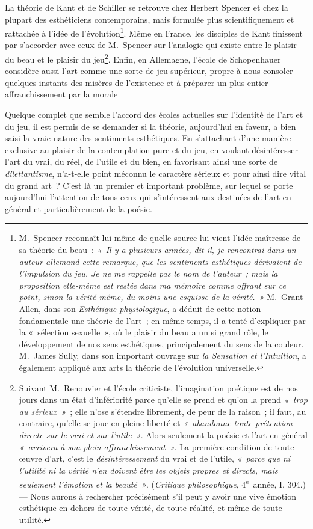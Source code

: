 \documentclass[french,twoside]{book} %
\begin{document}
La théorie de Kant et de Schiller se retrouve chez Herbert Spencer et chez la plupart des esthéticiens contemporains, mais formulée plus scientifiquement et rattachée à l’idée de l’évolution\footnote{M. Spencer reconnaît lui-même de quelle source lui vient l’idée maîtresse de sa théorie du beau : \emph{« Il y a plusieurs années, dit-il, je rencontrai dans un auteur allemand cette remarque, que les sentiments esthétiques dérivaient de l’impulsion du jeu. Je ne me rappelle pas le nom de l’auteur ; mais la proposition elle-même est restée dans ma mémoire comme offrant sur ce point, sinon la vérité même, du moins une esquisse de la vérité. »} M. Grant Allen, dans son \emph{Esthétique physiologique}, a déduit de cette notion fondamentale une théorie de l’art ; en même temps, il a tenté d’expliquer par la « sélection sexuelle », où le plaisir du beau a un si grand rôle, le développement de nos sens esthétiques, principalement du sens de la couleur. M. James Sully, dans son important ouvrage sur \emph{la Sensation et l’Intuition}, a également appliqué aux arts la théorie de l’évolution universelle.}. Même en France, les  disciples de Kant finissent par s’accorder avec ceux de M. Spencer sur l’analogie qui existe entre le plaisir du beau et le plaisir du jeu\footnote{Suivant M. Renouvier et l’école criticiste, l’imagination poétique est de nos jours dans un état d’infériorité parce qu’elle se prend et qu’on la prend \emph{« trop au \emph{sérieux} »} ; elle n’ose s’étendre librement, de peur de la raison ; il faut, au contraire, qu’elle se joue en pleine liberté et \emph{« abandonne toute prétention directe sur le vrai et sur l’utile »}. Alors seulement la poésie et l’art en général \emph{« arrivera à son plein affranchissement »}. La première condition de toute œuvre d’art, c’est le \emph{désintéressement} du vrai et de l’utile, \emph{« parce que ni l’utilité ni la vérité n’en doivent être les objets propres et directs, mais seulement l’émotion et la beauté »}. (\emph{Critique philosophique}, 4\textsuperscript{e} année, I, 304.) — Nous aurons à rechercher précisément s’il peut y avoir une vive émotion esthétique en dehors de toute vérité, de toute réalité, et même de toute utilité.}. Enfin, en Allemagne, l’école de Schopenhauer considère aussi l’art comme une sorte de jeu supérieur, propre à nous consoler quelques instants des misères de l’existence et à préparer un plus entier affranchissement par la morale\par
Quelque complet que semble l’accord des écoles actuelles sur l’identité de l’art et du jeu, il est permis de se demander si la théorie, aujourd’hui en faveur, a bien saisi la vraie nature des sentiments esthétiques. En s’attachant d’une manière exclusive au plaisir de la contemplation pure et du jeu, en voulant désintéresser l’art du vrai, du réel, de l’utile et  du bien, en favorisant ainsi une sorte de \emph{dilettantisme}, n’a-t-elle point méconnu le caractère sérieux et pour ainsi dire vital du grand art ? C’est là un premier et important problème, sur lequel se porte aujourd’hui l’attention de tous ceux qui s’intéressent aux destinées de l’art en général et particulièrement de la poésie.\par
\end{document}
